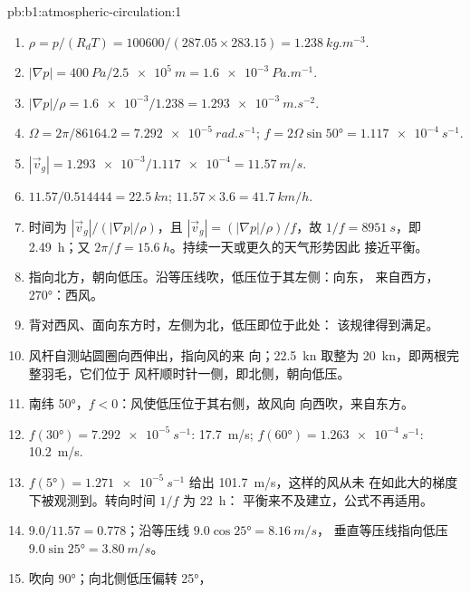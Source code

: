 \begin{solution}{pb:b1:atmospheric-circulation:1}
\begin{enumerate}
  \item $\rho = p/(R_dT) = \num{100600}/(287.05 \times 283.15) =
        \qty{1.238}{kg.m^{-3}}$.
  \item $|\nabla p| = \qty{400}{Pa}/\qty{2.5e5}{m} = \qty{1.6e-3}{Pa.m^{-1}}$.
  \item $|\nabla p|/\rho = \num{1.6e-3}/1.238 = \qty{1.293e-3}{m.s^{-2}}$.
  \item $\Omega = 2\pi/\num{86164.2} = \qty{7.292e-5}{rad.s^{-1}}$;
        $f = 2\Omega\sin\ang{50} = \qty{1.117e-4}{s^{-1}}$.
  \item $|\vec v_g| = \num{1.293e-3}/\num{1.117e-4} = \qty{11.57}{m/s}$.
  \item $11.57/0.514444 = \qty{22.5}{kn}$; $11.57 \times 3.6 = \qty{41.7}{km/h}$.
  \item 时间为 $|\vec v_g|/(|\nabla p|/\rho)$，且 $|\vec v_g| = (|\nabla
        p|/\rho)/f$，故 $1/f = \qty{8951}{s}$，即 \qty{2.49}{h}；又 $2\pi/f =
        \qty{15.6}{h}$。持续一天或更久的天气形势因此
        接近平衡。
  \item {}指向北方，朝向低压。沿等压线吹，低压位于其左侧：向东，
        来自西方， \ang{270}：西风。
  \item 背对西风、面向东方时，左侧为北，低压即位于此处：
        该规律得到满足。
  \item 风杆自测站圆圈向西伸出，指向风的来
        向；\qty{22.5}{kn} 取整为 \qty{20}{kn}，即两根完整羽毛，它们位于
        风杆顺时针一侧，即北侧，朝向低压。
  \item 南纬 \ang{50}，$f < 0$：风使低压位于其右侧，故风向
        向西吹，来自东方。
  \item $f(\ang{30}) = \qty{7.292e-5}{s^{-1}}$: \qty{17.7}{m/s}; $f(\ang{60}) =
        \qty{1.263e-4}{s^{-1}}$: \qty{10.2}{m/s}.
  \item $f(\ang{5}) = \qty{1.271e-5}{s^{-1}}$ 给出 \qty{101.7}{m/s}，这样的风从未
        在如此大的梯度下被观测到。转向时间 $1/f$ 为 \qty{22}{h}：
        平衡来不及建立，公式不再适用。
  \item $9.0/11.57 = 0.778$；沿等压线 $9.0\cos\ang{25} = \qty{8.16}{m/s}$，
        垂直等压线指向低压 $9.0\sin\ang{25} = \qty{3.80}{m/s}$。
  \item {}吹向 \ang{90}；向北侧低压偏转 \ang{25}，

\end{enumerate}
\end{solution}

